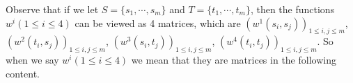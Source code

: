 \documentclass[a4paper,11pt]{amsart}
\numberwithin{equation}{section}
\begin{document}
Observe that if we let $S=\{s_1,\cdots, s_m\}$ and $T=\{t_1,\cdots ,t_m\}$, then the functions $w^i(1\leq i \leq 4)$ can be viewed as 4 matrices, which are
$(w^1(s_i,s_j))_{1\leq i,j \leq m}$, $(w^2(t_i,s_j))_{1\leq i,j \leq m}$, $(w^3(s_i,t_j))_{1\leq i,j \leq m}$, $(w^4(t_i,t_j))_{1\leq i,j \leq m}$. So when we say $w^i(1\leq i \leq 4)$ we mean that they are matrices in the following content.


%
\end{document}
